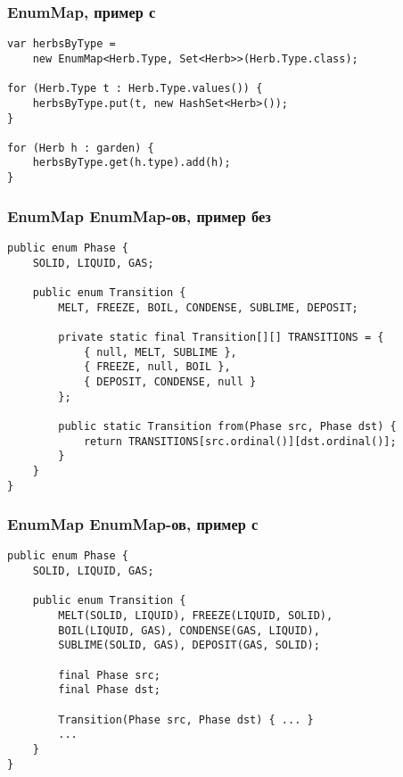 \documentclass[xetex,mathserif,serif]{beamer}
\begin{document}
	\begin{frame}[fragile]
		\frametitle{EnumMap, пример с}
		\begin{verbatim}
var herbsByType =
    new EnumMap<Herb.Type, Set<Herb>>(Herb.Type.class);

for (Herb.Type t : Herb.Type.values()) {
    herbsByType.put(t, new HashSet<Herb>());
}

for (Herb h : garden) {
    herbsByType.get(h.type).add(h);
}
		\end{verbatim}
	\end{frame}

	\begin{frame}[fragile]
		\frametitle{EnumMap EnumMap-ов, пример без}
		\begin{small}
			\begin{verbatim}
public enum Phase {
    SOLID, LIQUID, GAS;
    
    public enum Transition {
        MELT, FREEZE, BOIL, CONDENSE, SUBLIME, DEPOSIT;
        
        private static final Transition[][] TRANSITIONS = {
            { null, MELT, SUBLIME },
            { FREEZE, null, BOIL },
            { DEPOSIT, CONDENSE, null }
        };

        public static Transition from(Phase src, Phase dst) { 
            return TRANSITIONS[src.ordinal()][dst.ordinal()]; 
        }
    }
}
			\end{verbatim}
		\end{small}
	\end{frame}

	\begin{frame}[fragile]
		\frametitle{EnumMap EnumMap-ов, пример с}
		\begin{verbatim}
public enum Phase {
    SOLID, LIQUID, GAS;
    
    public enum Transition {
        MELT(SOLID, LIQUID), FREEZE(LIQUID, SOLID),
        BOIL(LIQUID, GAS), CONDENSE(GAS, LIQUID),
        SUBLIME(SOLID, GAS), DEPOSIT(GAS, SOLID);
        
        final Phase src;
        final Phase dst;
        
        Transition(Phase src, Phase dst) { ... }
        ...
    }
}
		\end{verbatim}
	\end{frame}
\end{document}
